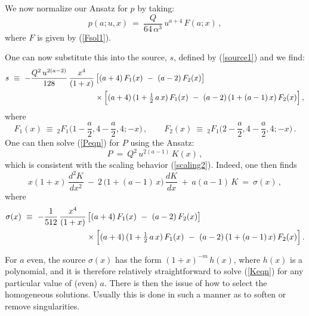 \documentclass[11pt]{article}
\def\coeff#1#2{\relax{\textstyle \frac{#1}{#2}}\displaystyle}
\numberwithin{equation}{section}
\begin{document}
We now normalize our Ansatz for $p$ by taking:
%
\begin{equation}
p(a;u, x)  ~=~ \frac{Q}{64\, \alpha^3} \, u^{a + 4} \,  F(a;x)   \,,
\label{pAnsatz2}
\end{equation}
%
where $F$ is given by (\ref{Fsol1}).

One can now substitute this into the source, $s$, defined by  (\ref{source1}) and we find:
%
\begin{equation}
\begin{aligned}
s  ~\equiv~ -\frac{Q^2\, u^{2(a-2)}}{128 } \,\frac{x^4}{(1+x)}  & \,\big[(a+4)\, F_1(x) ~-~  (a-2)\, F_2 (x) \big]\\
& \times \Big[(a+4)\,(1 + \coeff{1}{2}\, a\,x)\, F_1(x) ~-~  (a-2)\, (1 +  (a-1)\,x)\, F_2 (x) \Big] \,,
\end{aligned}
 \label{source2}
\end{equation}
%
where 
%
\begin{equation}
F_1(x)  ~\equiv~ {}_2F_1 \bigg(1- \frac{a}{2} , 4- \frac{a}{2}  , 4; -x \bigg) \,, \qquad F_2(x)  ~\equiv~ {}_2F_1 \bigg(2- \frac{a}{2} , 4- \frac{a}{2}  , 4; -x \bigg)  \,.
 \label{F1F2defns}
\end{equation}
%
One can then solve (\ref{Peqn}) for $P$ using the Ansatz: 
%
\begin{equation}
P  ~=~  Q^2\, u^{2(a-1)} \, K(x)   \,,
 \label{PAnsatz}
\end{equation}
%
which is consistent with the scaling behavior (\ref{scaling2}).  Indeed, one then finds
%
\begin{equation}
x(1+x) \, \frac{d^2 K}{dx^2}   ~-~2\,\big(1+(a-1)\, x\big) \, \frac{dK}{dx} ~+~a(a-1)  \, K ~=~ \sigma(x) \,,
\label{Keqn}
\end{equation}
%
where
%
\begin{equation}
\begin{aligned}
\sigma(x) ~\equiv~ 
 -\frac{1}{512} \,\frac{x^4}{(1+x)}  & \,\big[(a+4)\, F_1(x) ~-~  (a-2)\, F_2 (x) \big]\\
& \times \Big[(a+4)\,(1 + \coeff{1}{2}\, a\,x)\, F_1(x) ~-~  (a-2)\, (1 +  (a-1)\,x)\, F_2 (x) \Big] \,.
\end{aligned}
 \label{source3}
\end{equation}
%

For $a$ even, the source $\sigma(x)$ has the form $(1+x)^{-m} \, h(x)$, where $h(x)$ is a polynomial, and it is therefore relatively straightforward to solve (\ref{Keqn}) for any particular value of (even) $a$.  There is then the issue of how to select the homogeneous solutions.  Usually this is done in such a manner as to soften or remove singularities.
\end{document}
